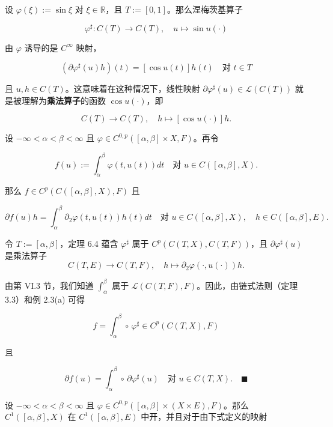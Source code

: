 \begin{example}

\begin{items}
\item

设 $ \varphi(\xi) := \sin\xi $ 对 $ \xi \in \mathbb{R} $，且 $ T := [0, 1] $。那么涅梅茨基算子

\[
\varphi^{\sharp} : C(T) \to C(T) , \quad u \mapsto \sin u(\cdot)
\]

由 $ \varphi $ 诱导的是 $ C^{\infty} $ 映射，

\[
(\partial\varphi^{\sharp}(u)h)(t) = [\cos u(t)]h(t) \quad \text{对 } t \in T
\]

且 $ u, h \in C(T) $。这意味着在这种情况下，线性映射 $ \partial\varphi^{\sharp}(u) \in \mathcal{L}(C(T)) $ 就是被理解为\textbf{乘法算子}的函数 $ \cos u(\cdot) $，即

\[
C(T) \to C(T) , \quad h \mapsto [\cos u(\cdot)]h .
\]
\item

设 $ -\infty < \alpha < \beta < \infty $ 且 $ \varphi \in C^{0,p}([\alpha, \beta] \times X, F) $。再令

\begin{equation}
f(u) := \int_{\alpha}^{\beta}\varphi(t, u(t)) dt \quad \text{对 } u \in C([\alpha, \beta], X) .\tag{6.3}
\end{equation}

那么 $ f \in C^{p}(C([\alpha, \beta], X), F) $ 且

\[
\partial f(u)h = \int_{\alpha}^{\beta}\partial_{2}\varphi(t, u(t))h(t) dt \quad \text{对 } u \in C([\alpha, \beta], X) , \quad h \in C([\alpha, \beta], E) .
\]

\proofhead
令 $ T := [\alpha, \beta] $，定理 6.4 蕴含 $ \varphi^{\sharp} $ 属于 $ C^{p}(C(T, X), C(T, F)) $，且 $ \partial\varphi^{\sharp}(u) $ 是乘法算子
\[
C(T, E) \to C(T, F) , \quad h \mapsto \partial_{2}\varphi(\cdot, u(\cdot))h .
\]

由第 VI.3 节，我们知道 $ \int_{\alpha}^{\beta} $ 属于 $ \mathcal{L}(C(T, F), F) $。因此，由链式法则（定理 3.3）和例 2.3(a) 可得

\[
f = \int_{\alpha}^{\beta} \circ\, \varphi^{\sharp} \in C^{p}(C(T, X), F)
\]

且

\[
\partial f(u) = \int_{\alpha}^{\beta} \circ\, \partial\varphi^{\sharp}(u) \quad \text{对 } u \in C(T, X) .\quad\blacksquare
\]
\item

设 $ -\infty < \alpha < \beta < \infty $ 且 $ \varphi \in C^{0,p}([\alpha, \beta] \times (X \times E), F) $。那么 $ C^{1}([\alpha, \beta], X) $ 在 $ C^{1}([\alpha, \beta], E) $ 中开，并且对于由下式定义的映射


\end{items}
\end{example}

